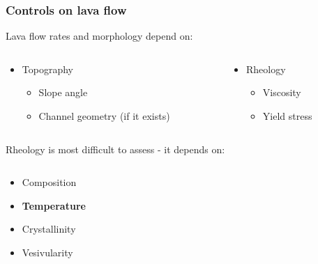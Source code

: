 \documentclass{beamer}
\begin{document}
\begin{frame}
  \frametitle{Controls on lava flow}

  Lava flow rates and morphology depend on:

  \begin{columns}[t]

    \begin{column}{0.5\paperwidth}

      \begin{itemize}
      \item Topography \\
        \begin{itemize}
        \item Slope angle \\
        \item Channel geometry (if it exists) \\
        \end{itemize}
      \end{itemize}

    \end{column}

    \begin{column}{0.5\paperwidth}

    \begin{itemize}
    \item Rheology \\
      \begin{itemize}
      \item Viscosity \\
      \item Yield stress \\ 
      \end{itemize}
    \end{itemize}

  \end{column}

\end{columns}

  \vspace{0.5cm}
  
  Rheology is most difficult to assess - it depends on:

  \begin{columns}[t]

    \begin{column}{0.5\paperwidth}

      \begin{itemize}
      \item Composition \\
      \item \textbf{Temperature} \\
      \item Crystallinity \\
      \item Vesivularity \\
      \end{itemize}


\end{column}
\end{columns}
\end{frame}
\end{document}
